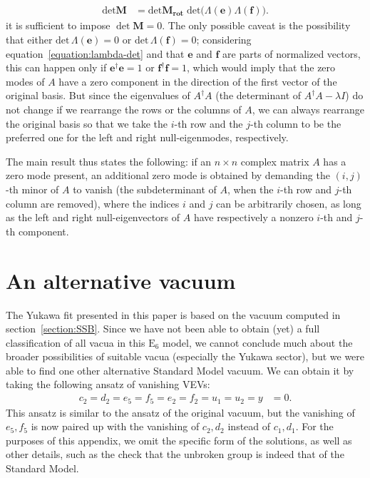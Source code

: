 \documentclass[a4paper,12pt]{article}
\def\EE{\mathrm{E}_6}
\begin{document}
\begin{align}
\mathrm{det}\mathbf{M}&=\mathrm{det}\mathbf{M_{rot}}\;\mathrm{det}\big(\Lambda(\mathbf{e})\Lambda(\mathbf{f})\big).
\end{align}
 it is sufficient to impose $\det\mathbf{M}=0$. The only possible caveat is the possibility that either $\mathrm{det}\,\Lambda(\mathbf{e})=0$ or $\mathrm{det}\,\Lambda(\mathbf{f})=0$; considering equation~\eqref{equation:lambda-det} and that $\mathbf{e}$ and $\mathbf{f}$ are parts of normalized vectors, this can happen only if $\mathbf{e}^\dagger\mathbf{e}=1$ or $\mathbf{f}^\dagger\mathbf{f}=1$, which would imply that the zero modes of $A$ have a zero component in the direction of the first vector of the original basis. But since the eigenvalues of $A^\dagger A$ (the determinant of $A^\dagger A-\lambda I$) do not change if we rearrange the rows or the columns of $A$, we can always rearrange the original basis so that we take the $i$-th row and the $j$-th column to be the preferred one for the left and right null-eigenmodes, respectively.

The main result thus states the following: if an $n\times n$ complex matrix $A$ has a zero mode present, an additional zero mode is obtained by demanding the $(i,j)$-th minor of $A$ to vanish (the subdeterminant of $A$, when the $i$-th row and $j$-th column are removed), where the indices $i$ and $j$ can be arbitrarily chosen, as long as the left and right null-eigenvectors of $A$ have respectively a nonzero $i$-th and $j$-th component.

\section{An alternative vacuum\label{section:vacuum2}}
The Yukawa fit presented in this paper is based on the vacuum computed in section~\ref{section:SSB}. Since we have not been able to obtain (yet) a full classification of all vacua in this $\EE$ model, we cannot conclude much about the broader possibilities of suitable vacua (especially the Yukawa sector), but we were able to find one other alternative Standard Model vacuum. We can obtain it by taking the following ansatz of vanishing VEVs:
\begin{align}
c_2=d_2=e_5=f_5=e_2=f_2=u_1=u_2=y&=0.\label{equation:alt-ansatz}
\end{align}
This ansatz is similar to the ansatz of the original vacuum, but the vanishing of $e_5,f_5$ is now paired up with the vanishing of $c_2,d_2$ instead of $c_1,d_1$. For the purposes of this appendix, we omit the specific form of the solutions, as well as other details, such as the check that the unbroken group is indeed that of the Standard Model.
\end{document}
